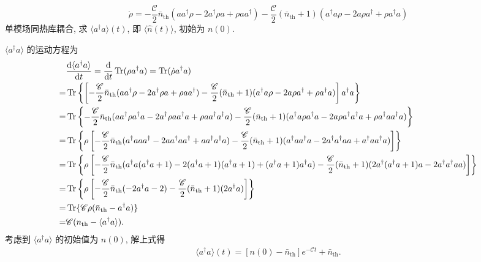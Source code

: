 \documentclass{assignment}
\begin{document}
\begin{prob}
    \[
        \dot{\rho}=-\frac{\mathscr{C}}{2}\bar{n}_{\text{th}}(aa^{\dagger}\rho-2a^{\dagger}\rho a+\rho aa^{\dagger})-\frac{\mathscr{C}}{2}(\bar{n}_{\text{th}}+1)(a^{\dagger}a\rho-2a\rho a^{\dagger}+\rho a^{\dagger}a)
    \]
    单模场同热库耦合, 求 $\langle a^{\dagger}a\rangle(t)$, 即 $\langle\hat{n}(t)\rangle$, 初始为 $n(0)$.
\end{prob}
\begin{sol}
    $\langle a^{\dagger}a\rangle$ 的运动方程为
    \begin{align}
        \notag&\frac{\mathrm{d}\langle a^{\dagger}a\rangle}{\mathrm{d}t}=\frac{\mathrm{d}}{\mathrm{d}t}\operatorname{Tr}(\rho a^{\dagger}a)=\operatorname{Tr}(\dot{\rho}a^{\dagger}a)\\
        \notag=&\operatorname{Tr}\left\{\left[-\frac{\mathscr{C}}{2}\bar{n}_{\text{th}}(aa^{\dagger}\rho-2a^{\dagger}\rho a+\rho aa^{\dagger})-\frac{\mathscr{C}}{2}(\bar{n}_{\text{th}}+1)(a^{\dagger}a\rho-2a\rho a^{\dagger}+\rho a^{\dagger}a)\right]a^{\dagger}a\right\}\\
        \notag=&\operatorname{Tr}\left\{-\frac{\mathscr{C}}{2}\bar{n}_{\text{th}}(aa^{\dagger}\rho a^{\dagger}a-2a^{\dagger}\rho aa^{\dagger}a+\rho aa^{\dagger}a^{\dagger}a)-\frac{\mathscr{C}}{2}(\bar{n}_{\text{th}}+1)(a^{\dagger}a\rho a^{\dagger}a-2a\rho a^{\dagger}a^{\dagger}a+\rho a^{\dagger}aa^{\dagger}a)\right\}\\
        \notag=&\operatorname{Tr}\left\{\rho\left[-\frac{\mathscr{C}}{2}\bar{n}_{\text{th}}(a^{\dagger}aaa^{\dagger}-2aa^{\dagger}aa^{\dagger}+aa^{\dagger}a^{\dagger}a)-\frac{\mathscr{C}}{2}(\bar{n}_{\text{th}}+1)(a^{\dagger}aa^{\dagger}a-2a^{\dagger}a^{\dagger}aa+a^{\dagger}aa^{\dagger}a)\right]\right\}\\
        \notag=&\operatorname{Tr}\left\{\rho\left[-\frac{\mathscr{C}}{2}\bar{n}_{\text{th}}(a^{\dagger}a(a^{\dagger}a+1)-2(a^{\dagger}a+1)(a^{\dagger}a+1)+(a^{\dagger}a+1)a^{\dagger}a)-\frac{\mathscr{C}}{2}(\bar{n}_{\text{th}}+1)(2a^{\dagger}(a^{\dagger}a+1)a-2a^{\dagger}a^{\dagger}aa)\right]\right\}\\
        \notag=&\operatorname{Tr}\left\{\rho\left[-\frac{\mathscr{C}}{2}\bar{n}_{\text{th}}(-2a^{\dagger}a-2)-\frac{\mathscr{C}}{2}(\bar{n}_{\text{th}}+1)(2a^{\dagger}a)\right]\right\}\\
        \notag=&\operatorname{Tr}\{\mathscr{C}\rho(\bar{n}_{\text{th}}-a^{\dagger}a)\}\\
        =&\mathscr{C}(n_{\text{th}}-\langle a^{\dagger}a\rangle).
    \end{align}
    考虑到 $\langle a^{\dagger}a\rangle$ 的初始值为 $n(0)$, 解上式得
    \begin{align}
        \langle a^{\dagger}a\rangle(t)=[n(0)-\bar{n}_{\text{th}}]e^{-\mathscr{C}t}+\bar{n}_{\text{th}}.
    \end{align}
\end{sol}
\end{document}
